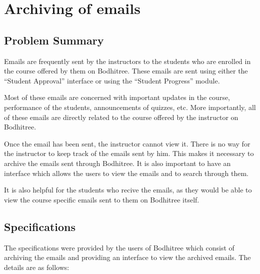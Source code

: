 \section{Archiving of emails}

\subsection{Problem Summary}

\hspace{0.35cm} Emails are frequently sent by the instructors to the students who are enrolled in the course offered by them on Bodhitree. These emails are sent using either the ``Student Approval'' interface or using the ``Student Progress'' module.
\par Most of these emails are concerned with important updates in the course, performance of the students, announcements of quizzes, etc. More importantly, all of these emails are directly related to the course offered by the instructor on Bodhitree.
\par Once the email has been sent, the instructor cannot view it. There is no way for the instructor to keep track of the emails sent by him. This makes it necessary to archive the emails sent through Bodhitree. It is also important to have an interface which allows the users to view the emails and to search through them.
\par It is also helpful for the students who recive the emails, as they would be able to view the course specific emails sent to them on Bodhitree itself.

\subsection{Specifications}

The specifications were provided by the users of Bodhitree which consist of archiving the emails and providing an interface to view the archived emails. The details are as follows:

